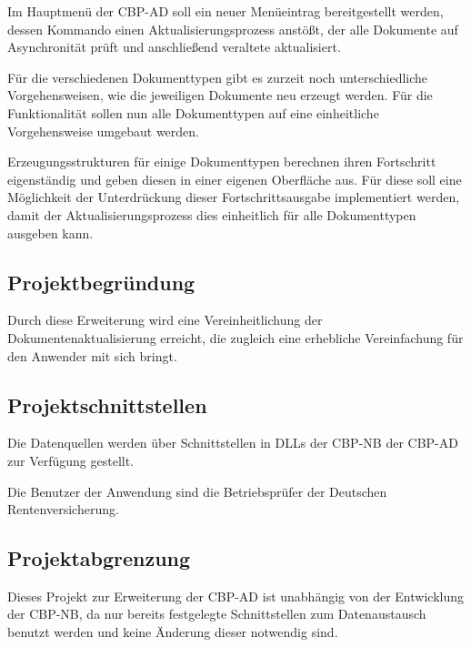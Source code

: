 Im Hauptmenü der \acs{CBP-AD} soll ein neuer Menüeintrag bereitgestellt werden, dessen Kommando einen Aktualisierungsprozess anstößt, der alle Dokumente auf Asynchronität prüft und anschließend veraltete aktualisiert.

Für die verschiedenen Dokumenttypen gibt es zurzeit noch unterschiedliche Vorgehensweisen, wie die jeweiligen Dokumente neu erzeugt werden. Für die Funktionalität  sollen nun alle Dokumenttypen auf eine einheitliche Vorgehensweise umgebaut werden.

Erzeugungsstrukturen für einige Dokumenttypen berechnen ihren Fortschritt eigenständig und geben diesen in einer eigenen Oberfläche aus. Für diese soll eine Möglichkeit der Unterdrückung dieser Fortschrittsausgabe implementiert werden, damit der Aktualisierungsprozess  dies einheitlich für alle Dokumenttypen ausgeben kann.


\subsection{Projektbegründung} 
\label{sec:Projektbegruendung}

Durch diese Erweiterung wird eine Vereinheitlichung der Dokumentenaktualisierung erreicht, die zugleich eine erhebliche Vereinfachung für den Anwender mit sich bringt.


\subsection{Projektschnittstellen} 
\label{sec:Projektschnittstellen}

Die Datenquellen werden über Schnittstellen in \acs{DLL}s der \acs{CBP-NB} der \acs{CBP-AD} zur Verfügung gestellt.

Die Benutzer der Anwendung sind die Betriebsprüfer der Deutschen Rentenversicherung.


\subsection{Projektabgrenzung} 
\label{sec:Projektabgrenzung}

Dieses Projekt zur Erweiterung der \acs{CBP-AD} ist unabhängig von der Entwicklung der \ac{CBP-NB}, da nur bereits festgelegte Schnittstellen zum Datenaustausch benutzt werden und keine Änderung dieser notwendig sind.